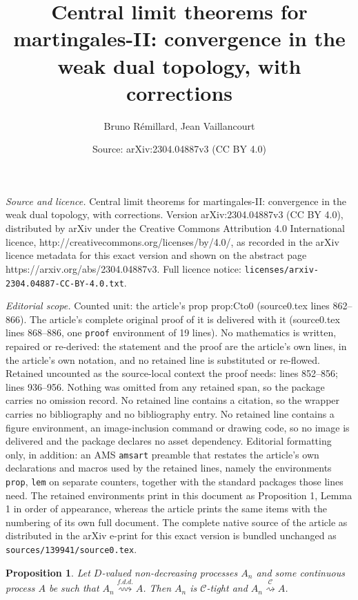 \documentclass[10pt,a4paper]{amsart}
\title{Central limit theorems for martingales-II: convergence in the weak dual topology, with corrections}
\author{Bruno R\'{e}millard, Jean Vaillancourt}
\date{Source: arXiv:2304.04887v3 (CC BY 4.0)}
\newtheorem{prop}{Proposition}
\begin{document}
\maketitle

\noindent\emph{Source and licence.} Central limit theorems for martingales-II: convergence in the weak dual topology, with corrections. Version arXiv:2304.04887v3 (CC BY 4.0), distributed by arXiv under the Creative Commons Attribution 4.0 International licence, http://creativecommons.org/licenses/by/4.0/, as recorded in the arXiv licence metadata for this exact version and shown on the abstract page https://arxiv.org/abs/2304.04887v3. Full licence notice: \texttt{licenses/arxiv-2304.04887-CC-BY-4.0.txt}.\par\smallskip

\noindent\textit{Editorial scope.} Counted unit: the article's prop prop:Cto0 (source0.tex lines 862--866). The article's complete original proof of it is delivered with it (source0.tex lines 868--886, one \texttt{proof} environment of 19 lines). No mathematics is written, repaired or re-derived: the statement and the proof are the article's own lines, in the article's own notation, and no retained line is substituted or re-flowed.  Retained uncounted as the source-local context the proof needs: lines 852--856; lines 936--956.  Nothing was omitted from any retained span, so the package carries no omission record.  No retained line contains a citation, so the wrapper carries no bibliography and no bibliography entry.  No retained line contains a figure environment, an image-inclusion command or drawing code, so no image is delivered and the package declares no asset dependency.  Editorial formatting only, in addition: an AMS \texttt{amsart} preamble that restates the article's own declarations and macros used by the retained lines, namely the environments \texttt{prop}, \texttt{lem} on separate counters, together with the standard packages those lines need.  The retained environments print in this document as Proposition 1, Lemma 1 in order of appearance, whereas the article prints the same items with the numbering of its own full document.  The complete native source of the article as distributed in the arXiv e-print for this exact version is bundled unchanged as \texttt{sources/139941/source0.tex}.
\begin{prop}\label{prop:Cincreasing}
Let $D$-valued non-decreasing processes $A_n$ and some continuous process $A$
be such that $A_n \stackrel{f.d.d.}{\rightsquigarrow} A$. Then $A_n$ is $\mathcal{C}$-tight
and $A_n \stackrel{\mathcal{C}}{\rightsquigarrow} A$.
\end{prop}
\end{document}
